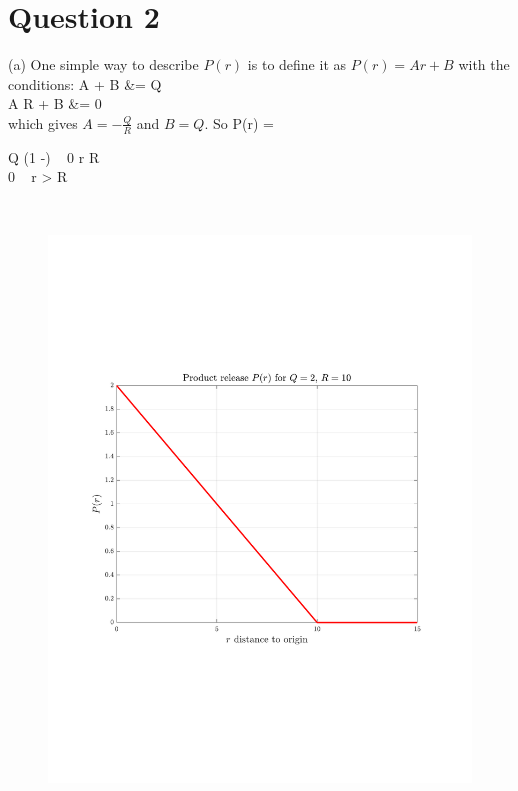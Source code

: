 \documentclass[12pt,twoside]{article}
\begin{document}
\ee

\section*{Question 2}

\be
\item [(a)]
One simple way to describe $P(r)$ is to define it as $P(r) = A r + B$ with the conditions:
\ba
	A  + B &= Q \\
	A \cdot R + B &= 0 \\	
\ea
which gives $A=-\frac{Q}{R}$ and $B=Q$.
So
\ba
	P(r) =
	\begin{cases}
	Q (1 -) ~  0 \le r \le R\ \\
	0 ~   r > R \\
	\end{cases} \\	
\ea


\begin{figure}[H]
 \centering
 \includegraphics[scale=0.5]{pr}
\end{figure}
	
\end{document}
